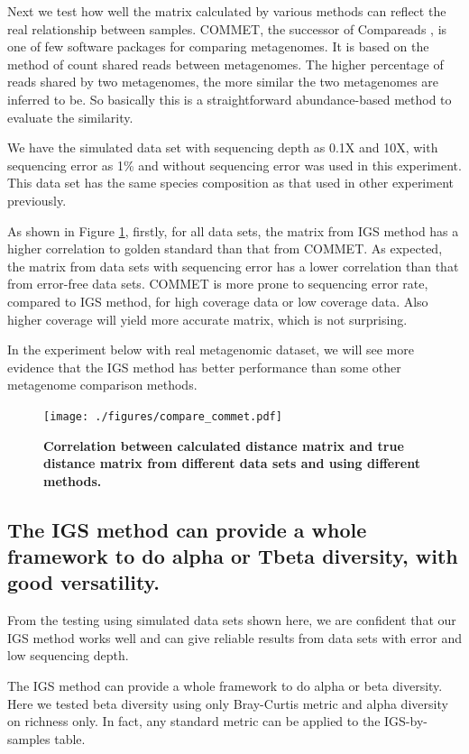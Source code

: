 Next we test how well the matrix calculated by various methods can reflect the
real relationship between samples. COMMET\cite{DBLP:conf/bibm/MailletCVLP14}, 
the successor of Compareads \cite{Maillet2012}, is one
of few software packages for comparing metagenomes. It is based on the method of
count shared reads between metagenomes. The higher percentage of reads
shared by two metagenomes, the more similar the two metagenomes are inferred to be. So
basically this is a straightforward abundance-based method to evaluate the
similarity.

We have the simulated data set with sequencing depth as 0.1X and 10X, with 
sequencing error as 1\% and without sequencing error was used in this experiment.
This data set has the same species composition as that used in other experiment previously.

As shown in Figure \ref{fig:compare_commet}, firstly, for 
all data sets, the matrix from IGS method has a higher 
correlation to golden standard than that from COMMET.  As expected, 
the matrix from data sets with sequencing error has a lower correlation 
than that from error-free
data sets. COMMET is more prone to sequencing error rate, compared to 
IGS method, for high coverage data or low coverage data.
Also higher coverage will yield more accurate matrix, which is not surprising.

In the experiment below with real metagenomic dataset, we will see more evidence
that the IGS method has better performance than some other metagenome comparison methods.

\begin{figure}[!ht]
 \centerline{\texttt{[image: ./figures/compare\_commet.pdf]}}
\caption{\bf Correlation between calculated distance matrix and true distance matrix
from different data sets and using different methods.}
\label{fig:compare_commet}
\end{figure}

\subsection{The IGS method can provide a whole framework to do alpha or 
Tbeta diversity, with good versatility.}

From the testing using simulated data sets shown here, we are confident that 
our IGS method works well and can give reliable results from data sets with 
error and low sequencing depth.

The IGS method can provide a whole framework to do alpha or beta diversity. 
Here we tested beta diversity using only Bray-Curtis metric and alpha 
diversity on richness only. In fact, any standard metric can be applied to the 
IGS-by-samples table.

